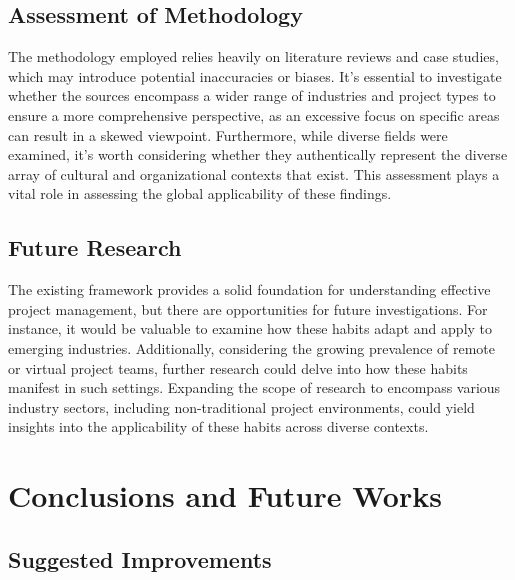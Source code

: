 \documentclass{article}
\begin{document}
\subsection{Assessment of Methodology}

The methodology employed relies heavily on literature reviews and case studies, which may introduce potential inaccuracies or biases. It's essential to investigate whether the sources encompass a wider range of industries and project types to ensure a more comprehensive perspective, as an excessive focus on specific areas can result in a skewed viewpoint. Furthermore, while diverse fields were examined, it's worth considering whether they authentically represent the diverse array of cultural and organizational contexts that exist. This assessment plays a vital role in assessing the global applicability of these findings.

\subsection{Future Research}

The existing framework provides a solid foundation for understanding effective project management, but there are opportunities for future investigations. For instance, it would be valuable to examine how these habits adapt and apply to emerging industries. Additionally, considering the growing prevalence of remote or virtual project teams, further research could delve into how these habits manifest in such settings. Expanding the scope of research to encompass various industry sectors, including non-traditional project environments, could yield insights into the applicability of these habits across diverse contexts.

\section{Conclusions and Future Works}
\subsection{Suggested Improvements}
\end{document}
